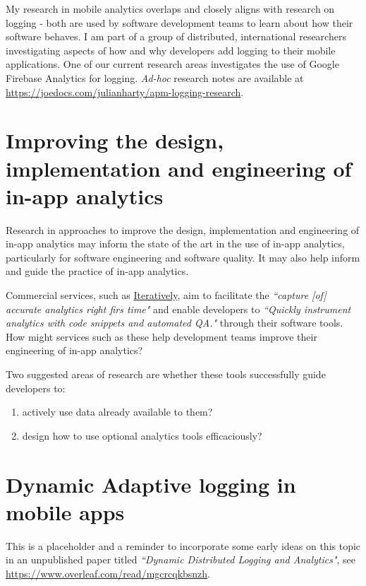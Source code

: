 My research in mobile analytics overlaps and closely aligns with research on logging - both are used by software development teams to learn about how their software behaves. I am part of a group of distributed, international researchers investigating aspects of how and why developers add logging to their mobile applications. One of our current research areas investigates the use of Google Firebase Analytics for logging. \emph{Ad-hoc} research notes are available at \url{https://joedocs.com/julianharty/apm-logging-research}.


\section{Improving the design, implementation and engineering of in-app analytics}
Research in approaches to improve the design, implementation and engineering of in-app analytics may inform the state of the art in the use of in-app analytics, particularly for software engineering and software quality. It may also help inform and guide the practice of in-app analytics. 

Commercial services, such as \href{http://iterative.ly}{Iteratively}, aim to facilitate the \emph{``capture [of] accurate analytics right firs time"} and enable developers to \emph{``Quickly instrument analytics with code snippets and automated QA."} through their software tools. How might services such as these help development teams improve their engineering of in-app analytics? 

Two suggested areas of research are whether these tools successfully guide developers to:
\begingroup
\renewcommand{\theenumi}{\alph{enumi}}
\begin{enumerate}
    \item actively use data already available to them?
    \item design how to use optional analytics tools efficaciously?
\end{enumerate}
\endgroup

\section{Dynamic Adaptive logging in mobile apps}
This is a placeholder and a reminder to incorporate some early ideas on this topic in an unpublished paper titled \emph{``Dynamic Distributed Logging and Analytics"}, see \url{https://www.overleaf.com/read/mgcrcqkbsnzh}.

